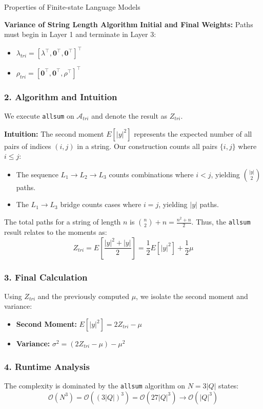 \begin{question}{Properties of Finite-state Language Models}
\begin{subquestion}{\textbf{Variance of String Length Algorithm}}
\textbf{Initial and Final Weights:}
Paths must begin in Layer 1 and terminate in Layer 3:
\begin{itemize}
    \item $\lambda_{tri} = [\lambda^\top, \mathbf{0}^\top, \mathbf{0}^\top]^\top$
    \item $\rho_{tri} = [\mathbf{0}^\top, \mathbf{0}^\top, \rho^\top]^\top$
\end{itemize}

\subsubsection*{2. Algorithm and Intuition}
We execute \texttt{allsum} on $\mathcal{A}_{tri}$ and denote the result as $Z_{tri}$. 

\textbf{Intuition:} The second moment $E[|y|^2]$ represents the expected number of all pairs of indices $(i, j)$ in a string. Our construction counts all pairs $\{i, j\}$ where $i \le j$:
\begin{itemize}
    \item The sequence $L_1 \to L_2 \to L_3$ counts combinations where $i < j$, yielding $\binom{|y|}{2}$ paths.
    \item The $L_1 \to L_3$ bridge counts cases where $i = j$, yielding $|y|$ paths.
\end{itemize}
The total paths for a string of length $n$ is $\binom{n}{2} + n = \frac{n^2 + n}{2}$. Thus, the \texttt{allsum} result relates to the moments as:
\begin{equation}
    Z_{tri} = E\left[ \frac{|y|^2 + |y|}{2} \right] = \frac{1}{2}E[|y|^2] + \frac{1}{2}\mu
\end{equation}

\subsubsection*{3. Final Calculation}
Using $Z_{tri}$ and the previously computed $\mu$, we isolate the second moment and variance:
\begin{itemize}
    \item \textbf{Second Moment:} $E[|y|^2] = 2Z_{tri} - \mu$
    \item \textbf{Variance:} $\sigma^2 = (2Z_{tri} - \mu) - \mu^2$
\end{itemize}

\subsubsection*{4. Runtime Analysis}
The complexity is dominated by the \texttt{allsum} algorithm on $N = 3|Q|$ states:
\begin{equation}
    \mathcal{O}(N^3) = \mathcal{O}((3|Q|)^3) = \mathcal{O}(27|Q|^3) \to \mathcal{O}(|Q|^3)
\end{equation}


\end{subquestion}
\end{question}
